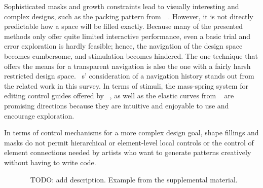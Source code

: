 Sophisticated masks and growth constraints lead to visually interesting and complex designs, such as the packing pattern from~\citeauthor*{saputra_2018_rde}~\cite{saputra_2018_rde}. However, it is not directly predictable how a space will be filled exactly. Because many of the presented methods only offer quite limited interactive performance, even a basic trial and error exploration is hardly feasible; hence, the navigation of the design space becomes cumbersome, and stimulation becomes hindered. The one technique \cite{santoni_2016_ggp} that offers the means for a transparent navigation is also the one with a fairly harsh restricted design space. \citeauthor*{santoni_2016_ggp}~\cite{santoni_2016_ggp}s' consideration of a navigation history stands out from the related work in this survey. In terms of stimuli, the mass-spring system for editing control guides offered by \citeauthor*{benes_2011_gpm}~\cite{benes_2011_gpm}, as well as the elastic curves from \citeauthor*{zehnder_2016_dso}~\cite{zehnder_2016_dso} are promising directions because they are intuitive and enjoyable to use and encourage exploration.

In terms of control mechanisms for a more complex design goal, shape fillings and masks do not permit hierarchical or element-level local controls or the control of element connections needed by artists who want to generate patterns creatively without having to write code.

\begin{figure}[H]
    \centering
    \label{fig:zehnder_2016_dso}
    \caption{\citeauthor*{zehnder_2016_dso}~\cite{zehnder_2016_dso} TODO: add description. Example from the supplemental material. \color{orange}{Status rights: ACM requested}}
\end{figure}


